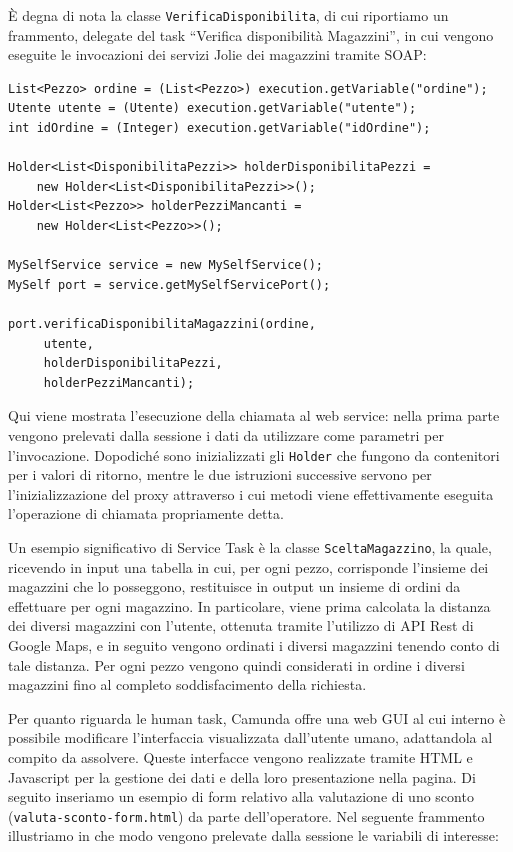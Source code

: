 \documentclass[twoside]{article}
\begin{document}
\`E degna di nota la classe \texttt{VerificaDisponibilita}, di cui riportiamo
un frammento, delegate del task ``Verifica disponibilità Magazzini'',
in cui vengono eseguite le invocazioni dei servizi Jolie dei magazzini tramite SOAP:

\begin{lstlisting}
List<Pezzo> ordine = (List<Pezzo>) execution.getVariable("ordine");
Utente utente = (Utente) execution.getVariable("utente");
int idOrdine = (Integer) execution.getVariable("idOrdine");
    
Holder<List<DisponibilitaPezzi>> holderDisponibilitaPezzi = 
    new Holder<List<DisponibilitaPezzi>>();
Holder<List<Pezzo>> holderPezziMancanti = 
    new Holder<List<Pezzo>>();
    
MySelfService service = new MySelfService();
MySelf port = service.getMySelfServicePort();

port.verificaDisponibilitaMagazzini(ordine, 
     utente, 
     holderDisponibilitaPezzi, 
     holderPezziMancanti);
\end{lstlisting}

Qui viene mostrata l'esecuzione della chiamata al web service: nella prima parte
vengono prelevati dalla sessione i dati da utilizzare come parametri per l'invocazione.
Dopodiché sono inizializzati gli \texttt{Holder} che fungono da contenitori per
i valori di ritorno, mentre le due istruzioni successive servono per l'inizializzazione
del proxy attraverso i cui metodi viene effettivamente eseguita l'operazione di chiamata
propriamente detta.

Un esempio significativo di Service Task è la classe \texttt{SceltaMagazzino},
la quale, ricevendo in input una tabella in cui, per ogni pezzo, corrisponde l'insieme
dei magazzini che lo posseggono, restituisce in output un insieme di ordini da effettuare
per ogni magazzino. In particolare, viene prima calcolata la distanza dei diversi magazzini
con l'utente, ottenuta tramite l'utilizzo di API Rest di Google Maps, e in seguito vengono
ordinati i diversi magazzini tenendo conto di tale distanza. Per ogni pezzo vengono quindi
considerati in ordine i diversi magazzini fino al completo soddisfacimento della richiesta.

Per quanto riguarda le human task, Camunda offre una web GUI al cui interno 
è possibile modificare l'interfaccia visualizzata dall'utente umano, adattandola
al compito da assolvere. Queste interfacce vengono realizzate tramite HTML e Javascript
per la gestione dei dati e della loro presentazione nella pagina. Di seguito inseriamo
un esempio di form relativo alla valutazione di uno sconto
(\texttt{valuta-sconto-form.html}) da parte dell'operatore. Nel seguente frammento
illustriamo in che modo vengono prelevate dalla sessione le variabili di interesse:
\end{document}
